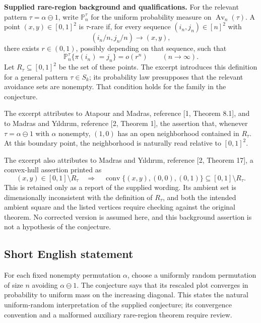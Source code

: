 \documentclass[11pt]{article}
\begin{document}
\textbf{Supplied rare-region background and qualifications.} For the relevant pattern \(\tau=\alpha\ominus1\), write \(\mathbb P_n^\tau\) for the uniform probability measure on \(\operatorname{Av}_n(\tau)\). A point \((x,y)\in[0,1]^2\) is \(\tau\)-rare if, for every sequence \((i_n,j_n)\in[n]^2\) with
\[
(i_n/n,j_n/n)\longrightarrow(x,y),
\]
there exists \(r\in(0,1)\), possibly depending on that sequence, such that
\[
\mathbb P_n^\tau\{\pi(i_n)=j_n\}=o(r^n)
\qquad(n\to\infty).
\]
Let \(R_\tau\subseteq[0,1]^2\) be the set of these points. The excerpt introduces this definition for a general pattern \(\tau\in S_k\); its probability law presupposes that the relevant avoidance sets are nonempty. That condition holds for the family in the conjecture.

The excerpt attributes to Atapour and Madras, reference [1, Theorem 8.1], and to Madras and Yıldırım, reference [2, Theorem 1], the assertion that, whenever \(\tau=\alpha\ominus1\) with \(\alpha\) nonempty, \((1,0)\) has an open neighborhood contained in \(R_\tau\). At this boundary point, the neighborhood is naturally read relative to \([0,1]^2\).

The excerpt also attributes to Madras and Yıldırım, reference [2, Theorem 17], a convex-hull assertion printed as
\[
(x,y)\in[0,1]\setminus R_\tau
\quad\Longrightarrow\quad
\operatorname{conv}\{(x,y),(0,0),(0,1)\}
\subseteq[0,1]\setminus R_\tau.
\]
This is retained only as a report of the supplied wording. Its ambient set is dimensionally inconsistent with the definition of \(R_\tau\), and both the intended ambient square and the listed vertices require checking against the original theorem. No corrected version is assumed here, and this background assertion is not a hypothesis of the conjecture.
\subsection{Short English statement}
For each fixed nonempty permutation \(\alpha\), choose a uniformly random permutation of size \(n\) avoiding \(\alpha\ominus1\). The conjecture says that its rescaled plot converges in probability to uniform mass on the increasing diagonal. This states the natural uniform-random interpretation of the supplied conjecture; its convergence convention and a malformed auxiliary rare-region theorem require review.
\end{document}
